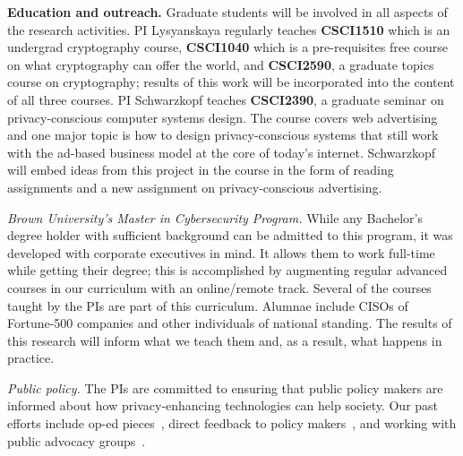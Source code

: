 \noindent\textbf{Education and outreach.} Graduate students will be involved in all aspects of the research activities.  PI Lysyanskaya
regularly teaches \textbf{CSCI1510} which is an undergrad cryptography course, \textbf{CSCI1040} which is a pre-requisites free course on what cryptography can offer the world, and \textbf{CSCI2590}, a graduate topics course on cryptography; results of this work will be incorporated into the content of all three courses.
%
PI Schwarzkopf teaches \textbf{CSCI2390}, a graduate seminar on privacy-conscious computer systems design. The course covers web advertising and one major topic is how to design privacy-conscious systems that still work with the ad-based business model at the core of today's internet. Schwarzkopf will embed ideas from this project in the course in the form of reading assignments and a new assignment on privacy-conscious advertising.
%

\noindent\textit{Brown University's Master in Cybersecurity Program.} While any Bachelor's degree holder with sufficient background can be admitted to this program, it was 
developed with corporate executives in mind. It allows them to work full-time while getting their degree; this is accomplished by augmenting regular advanced courses in our curriculum with an online/remote track.  Several of the courses taught by the PIs are part of this curriculum.  Alumnae include CISOs of Fortune-500 companies and other individuals of national standing.  
The results of this research will inform what we teach them and, as a result, what happens in practice.

\noindent\textit{Public policy.} The PIs are committed to ensuring that public policy makers are informed about how privacy-enhancing technologies can help society.  Our past efforts include op-ed pieces~\cite{projo1,csm,projo2}, direct feedback to policy makers~\cite{annacdt}, and working with public advocacy groups~\cite{epic15}.
